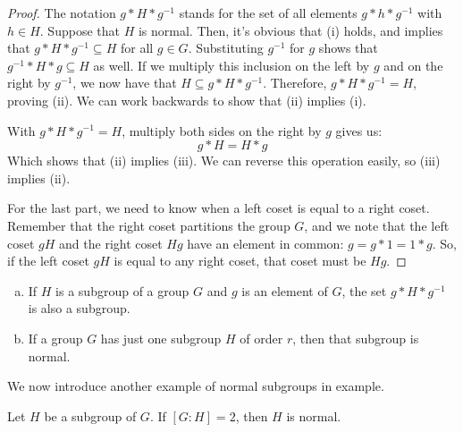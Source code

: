\documentclass[letterpaper]{article}
\begin{document}
\begin{mdframed}
    \begin{proof}
        The notation $g * H * g^{-1}$ stands for the set of all elements $g * h * g^{-1}$ with $h \in H$. Suppose that $H$ is normal. Then, it's obvious that (i) holds, and implies that $g * H * g^{-1} \subseteq H$ for all $g \in G$. Substituting $g^{-1}$ for $g$ shows that $g^{-1} * H * g \subseteq H$ as well. If we multiply this inclusion on the left by $g$ and on the right by $g^{-1}$, we now have that $H \subseteq g * H * g^{-1}$. Therefore, $g * H * g^{-1} = H$, proving (ii). We can work backwards to show that (ii) implies (i). 

        \bigskip 

        With $g * H * g^{-1} = H$, multiply both sides on the right by $g$ gives us: 
        \[g * H = H * g\]
        Which shows that (ii) implies (iii). We can reverse this operation easily, so (iii) implies (ii).

        \bigskip 

        For the last part, we need to know when a left coset is equal to a right coset. Remember that the right coset partitions the group $G$, and we note that the left coset $gH$ and the right coset $Hg$ have an element in common: $g = g * 1 = 1 * g$. So, if the left coset $gH$ is equal to any right coset, that coset must be $Hg$. 
    \end{proof}
\end{mdframed}

\begin{mdframed}
    \begin{proposition}
        \begin{enumerate}[(a)]
            \item If $H$ is a subgroup of a group $G$ and $g$ is an element of $G$, the set $g * H * g^{-1}$ is also a subgroup. 
            \item If a group $G$ has just one subgroup $H$ of order $r$, then that subgroup is normal. 
        \end{enumerate}
    \end{proposition}
\end{mdframed}

We now introduce another example of normal subgroups in example. 

\begin{mdframed}
    \begin{proposition}
        Let $H$ be a subgroup of $G$. If $[G: H] = 2$, then $H$ is normal.
    \end{proposition}
\end{mdframed}
\end{document}
